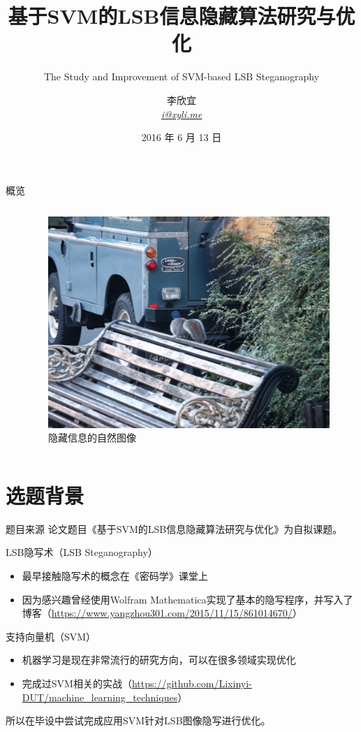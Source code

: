 \documentclass[14pt]{Bredelebeamer}
\title[本科毕设]{基于SVM的LSB信息隐藏算法研究与优化}
\subtitle{The Study and Improvement of SVM-based LSB Steganography}
\author[\href{mailto:i@xyli.me}{\faEnvelopeO{ } \textit{i@xyli.me}}]{李欣宜 \\ \href{mailto:i@xyli.me}{\faEnvelopeO{ } \textit{i@xyli.me}}}
\institute[]{大连理工大学}
\date{\faCalendar{ } 2016 年 6 月 13 日}
\begin{document}
\begin{frame}
  \titlepage
\end{frame}

\begin{frame}{概览}
  \begin{columns}
    \begin{column}{.3\textwidth}
        \tableofcontents
    \end{column}
    \begin{column}{.68\textwidth}
      \begin{figure}
        \centering
        \caption{隐藏信息的自然图像}
        \includegraphics[width=.8\textwidth]{images/naturepic.png}
      \end{figure}
    \end{column}
  \end{columns}
\end{frame}

\section{选题背景}
\begin{frame}{题目来源}
  论文题目《基于SVM的LSB信息隐藏算法研究与优化》为自拟课题。
  \begin{alertblock}{LSB隐写术（LSB Steganography）}
    \begin{itemize}
      \item 最早接触隐写术的概念在《密码学》课堂上
      \item 因为感兴趣曾经使用Wolfram Mathematica实现了基本的隐写程序，并写入了博客（\faChain \url{https://www.yangzhou301.com/2015/11/15/861014670/}）
    \end{itemize}
  \end{alertblock}
  \begin{block}{支持向量机（SVM）}
    \begin{itemize}
      \item 机器学习是现在非常流行的研究方向，可以在很多领域实现优化
      \item 完成过SVM相关的实战（\faChain \url{https://github.com/Lixinyi-DUT/machine_learning_techniques}）
    \end{itemize}
  \end{block}
  所以在毕设中尝试完成应用SVM针对LSB图像隐写进行优化。
\end{frame}
\end{document}
